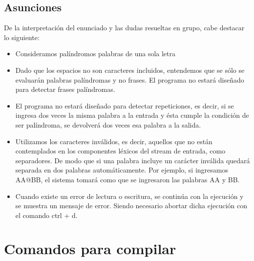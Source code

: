 \documentclass[a4paper,10pt]{article}
\begin{document}
\subsection{Asunciones}

De la interpretaci\'on del enunciado y las dudas resueltas en grupo, cabe destacar lo siguiente:\\
\begin{itemize}
	\item Consideramos pal\'indromos palabras de una sola letra
	\item Dado que los espacios no son caracteres incluidos, entendemos que se s\'olo se evaluar\'an palabras pal\'indromas y no frases. El programa no estar\'a dise\~nado para detectar frases pal\'indromas.
	\item El programa no estar\'a dise\~nado para detectar repeticiones, es decir, si se ingresa dos veces la misma palabra a la entrada y \'esta cumple la condici\'on de ser pal\'indroma, se devolver\'a dos veces esa palabra a la salida.
	\item Utilizamos los caracteres inv\'alidos, es decir, aquellos que no est\'an contemplados en los componentes l\'exicos del stream de entrada, como separadores. De modo que si una palabra incluye un car\'acter inv\'alida quedar\'a separada en dos palabras autom\'aticamente.
	Por ejemplo, si ingresamos AA@BB, el sistema tomar\'a como que se ingresaron las palabras AA y BB.
	\item Cuando existe un error de lectura o escritura, se contin\'ua con la ejecuci\'on y se muestra un mensaje de error. Siendo necesario abortar dicha ejecuci\'on con el comando ctrl + d.
\end{itemize}


\section{Comandos para compilar}
\end{document}
